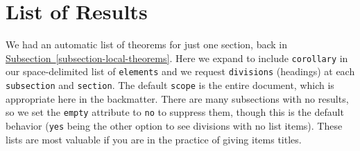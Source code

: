 \documentclass[10pt,]{article}
\theoremstyle{plain}
\theoremstyle{definition}
\theoremstyle{definition}
\theoremstyle{definition}
\theoremstyle{definition}
\theoremstyle{definition}
\theoremstyle{definition}
\numberwithin{equation}{section}
\begin{document}
\section[{List of Results}]{List of Results}\label{appendix-results}
\hypertarget{p-795}{}%
We had an automatic list of theorems for just one section, back in \hyperref[subsection-local-theorems]{Subsection~\ref{subsection-local-theorems}}.  Here we expand to include \lstinline?corollary? in our space-delimited list of \lstinline?elements? and we request \lstinline?divisions? (headings) at each \lstinline?subsection? and \lstinline?section?.  The default \lstinline?scope? is the entire document, which is appropriate here in the backmatter.  There are many subsections with no results, so we set the \lstinline?empty? attribute to \lstinline?no? to suppress them, though this is the default behavior (\lstinline?yes? being the other option to see divisions with no list items).  These lists are most valuable if you are in the practice of giving items titles.%
\noindent
\end{document}
